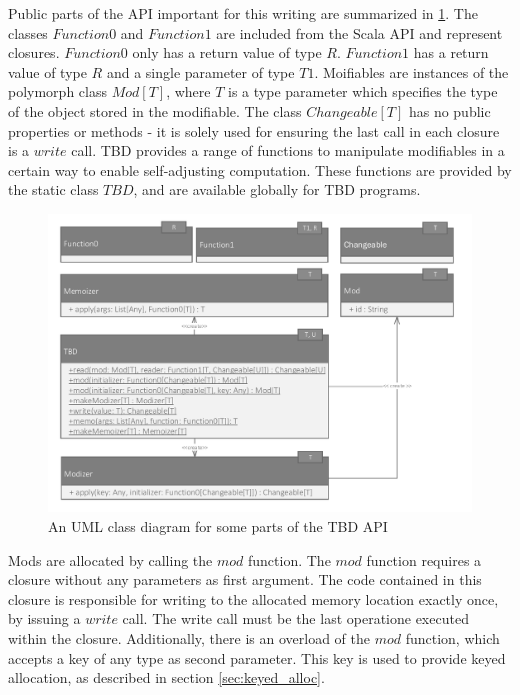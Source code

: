 Public parts of the API important for this writing are summarized in \ref{fig:tbd_uml}. The classes $Function0$ and $Function1$ are included from the Scala API and represent closures. $Function0$ only has a return value of type $R$. $Function1$ has a return value of type $R$ and a single parameter of type $T1$. Moifiables are instances of the polymorph class $Mod[T]$, where $T$ is a type parameter which specifies the type of the object stored in the modifiable. The class $Changeable[T]$ has no public properties or methods - it is solely used for ensuring the last call in each closure is a $write$ call. TBD provides a range of functions to manipulate modifiables in a certain way to enable self-adjusting computation. These functions are provided by the static class $TBD$, and are available globally for TBD programs. 
\begin{figure}
\begin{center}
\includegraphics[scale=0.7]{uml/TBD.pdf}
\end{center}
\caption{An UML class diagram for some parts of the TBD API}
\label{fig:tbd_uml}
\end{figure}

Mods are allocated by calling the $mod$ function. The $mod$ function requires a closure without any parameters as first argument. The code contained in this closure is responsible for writing to the allocated memory location exactly once, by issuing a $write$ call. The write call must be the last operatione executed within the closure. Additionally, there is an overload of the $mod$ function, which accepts a key of any type as second parameter. This key is used to provide keyed allocation, as described in section \ref{sec:keyed_alloc}. 

